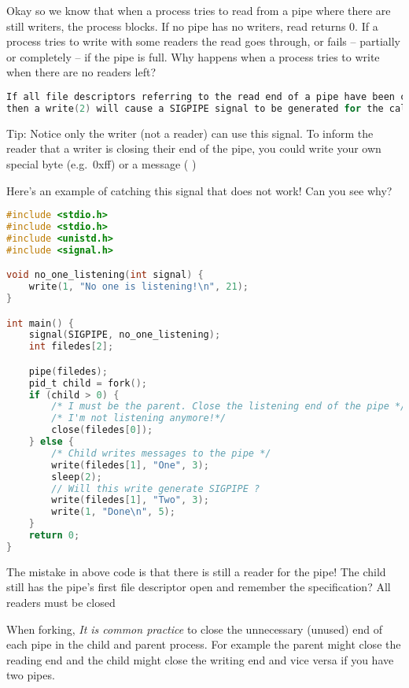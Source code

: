 Okay so we know that when a process tries to read from a pipe where there are still writers, the process blocks.
If no pipe has no writers, read returns 0.
If a process tries to write with some readers the read goes through, or fails -- partially or completely -- if the pipe is full.
Why happens when a process tries to write when there are no readers left?

\begin{lstlisting}[language=C]
If all file descriptors referring to the read end of a pipe have been closed,
then a write(2) will cause a SIGPIPE signal to be generated for the calling process.
\end{lstlisting}

Tip: Notice only the writer (not a reader) can use this signal. To
inform the reader that a writer is closing their end of the pipe, you
could write your own special byte (e.g.~0xff) or a message (
)

Here's an example of catching this signal that does not work! Can you see why?

\begin{lstlisting}[language=C]
#include <stdio.h>
#include <stdio.h>
#include <unistd.h>
#include <signal.h>

void no_one_listening(int signal) {
    write(1, "No one is listening!\n", 21);
}

int main() {
    signal(SIGPIPE, no_one_listening);
    int filedes[2];

    pipe(filedes);
    pid_t child = fork();
    if (child > 0) {
        /* I must be the parent. Close the listening end of the pipe */
        /* I'm not listening anymore!*/
        close(filedes[0]);
    } else {
        /* Child writes messages to the pipe */
        write(filedes[1], "One", 3);
        sleep(2);
        // Will this write generate SIGPIPE ?
        write(filedes[1], "Two", 3);
        write(1, "Done\n", 5);
    }
    return 0;
}
\end{lstlisting}

The mistake in above code is that there is still a reader for the pipe!
The child still has the pipe's first file descriptor open and remember the specification? All readers must be closed

When forking, \emph{It is common practice} to close the unnecessary (unused) end of each pipe in the child and parent process. For example the parent might close the reading end and the child might close the writing end and vice versa if you have two pipes.

